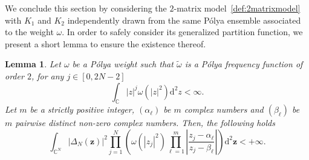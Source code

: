 \documentclass[pdflatex,sn-mathphys-num]{sn-jnl}
\theoremstyle{thmstyleone}
\newtheorem{lemma}[theorem]{Lemma}
\numberwithin{equation}{section}
\newcommand{\C}{\mathbb{C}}
\begin{document}
We conclude this section by considering the $2$-matrix model~\eqref{def:2matrixmodel} with $K_1$ and $K_2$ independently drawn from the same P\'olya ensemble associated to the weight $\omega$. In order to safely consider its generalized partition function, we present a short lemma to ensure the existence thereof.

\begin{lemma}\label{lemma:existence}
    Let $\omega$ be a P\'olya weight such that $\widetilde{\omega}$ is a P\'olya frequency function of order $2$, for any $j\in[0,2N-2]$ 
    \begin{equation}
        \int_{\C}|z|^{j}\omega(|z|^2)\mathrm{d}^2z<\infty.
    \end{equation}
    Let $m$ be a strictly positive integer, $(\alpha_{\ell})$ be $m$ complex numbers and $(\beta_{\ell})$ be $m$ pairwise distinct  non-zero complex numbers.
    Then, the following holds
    \begin{equation}
        \int_{\C^{N}}\left|\Delta_{N}(\mathbf{z})\right|^{2}\prod\limits_{j=1}^{N}\left(\omega(\left|z_{j}\right|^{2})\prod\limits_{\ell=1}^{m}\left|\frac{z_{j}-\alpha_{\ell}}{z_{j}-\beta_{\ell}}\right|\right)\mathrm{d}^{2}\mathbf{z}<+\infty.
    \end{equation}
\end{lemma}
\end{document}
